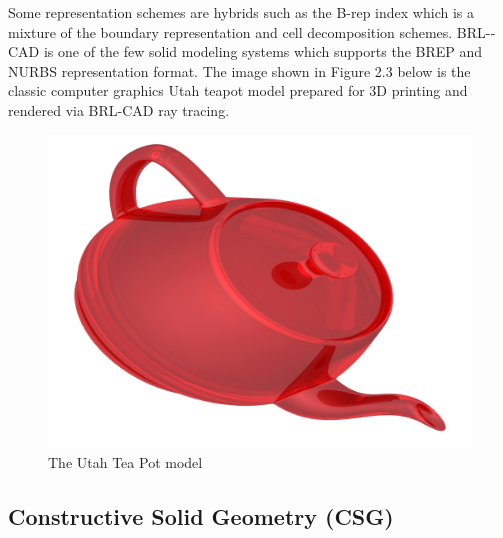 \hspace{30} Some   representation   schemes   are   hybrids   such   as   the   B-­rep   index   which  
is   a   mixture   of   the   boundary   representation   and   cell   decomposition   schemes.  
BRL-­CAD   is   one   of   the   few   solid   modeling   systems   which   supports   the  
BREP and NURBS   representation   format.  The   image   shown   in   Figure   2.3   below   is   the   classic   computer   graphics   Utah  teapot model prepared for 3D printing and rendered via BRL-­CAD ray tracing.\\

\begin{figure}[htbp]
\centering
\includegraphics[trim=0.0cm 0.3cm 0.3cm 0.3cm, clip=true, totalheight=0.5\textheight]{Pictures/Teapot.png}
\caption[The Utah Tea Pot model]{The Utah Tea Pot model}
\label{Teapot}
\end{figure}
 
\subsection{Constructive Solid Geometry (CSG)}


